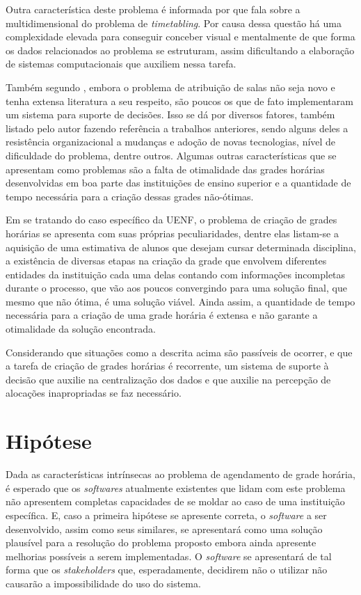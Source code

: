 Outra característica deste problema é informada por  que fala sobre a multidimensional do problema de \textit{timetabling}. Por causa dessa questão há uma complexidade elevada para conseguir conceber visual e mentalmente de que forma os dados relacionados ao problema se estruturam, assim dificultando a elaboração de sistemas computacionais que auxiliem nessa tarefa.

Também segundo , embora o problema de atribuição de salas não seja novo e tenha extensa literatura a seu respeito, são poucos os que de fato implementaram um sistema para suporte de decisões. Isso se dá por diversos fatores, também listado pelo autor fazendo referência a trabalhos anteriores, sendo alguns deles a resistência organizacional a mudanças e adoção de novas tecnologias, nível de dificuldade do problema, dentre outros. Algumas outras características que se apresentam como problemas são a falta de otimalidade das grades horárias desenvolvidas em boa parte das instituições de ensino superior e a quantidade de tempo necessária para a criação dessas grades não-ótimas.

Em se tratando do caso específico da UENF, o problema de criação de grades horárias se apresenta com suas próprias peculiaridades, dentre elas listam-se a aquisição de uma estimativa de alunos que desejam cursar determinada disciplina, a existência de diversas etapas na criação da grade que envolvem diferentes entidades da instituição cada uma delas contando com informações incompletas durante o processo, que vão aos poucos convergindo para uma solução final, que mesmo que não ótima, é uma solução viável. Ainda assim, a quantidade de tempo necessária para a criação de uma grade horária é extensa e não garante a otimalidade da solução encontrada.

Considerando que situações como a descrita acima são passíveis de ocorrer, e que a tarefa de criação de grades horárias é recorrente, um sistema de suporte à decisão que auxilie na centralização dos dados e que auxilie na percepção de alocações inapropriadas se faz necessário.

\section{Hipótese} \label{sec:Hipótese}                  %

Dada as características intrínsecas ao problema de agendamento de grade horária, é esperado que os \textit{softwares} atualmente existentes que lidam com este problema não apresentem completas capacidades de se moldar ao caso de uma instituição específica. E, caso a primeira hipótese se apresente correta, o \textit{software} a ser desenvolvido, assim como seus similares, se apresentará como uma solução plausível para a resolução do problema proposto embora ainda apresente melhorias possíveis a serem implementadas. O \textit{software} se apresentará de tal forma que os \textit{stakeholders} que, esperadamente, decidirem não o utilizar não causarão a impossibilidade do uso do sistema.

